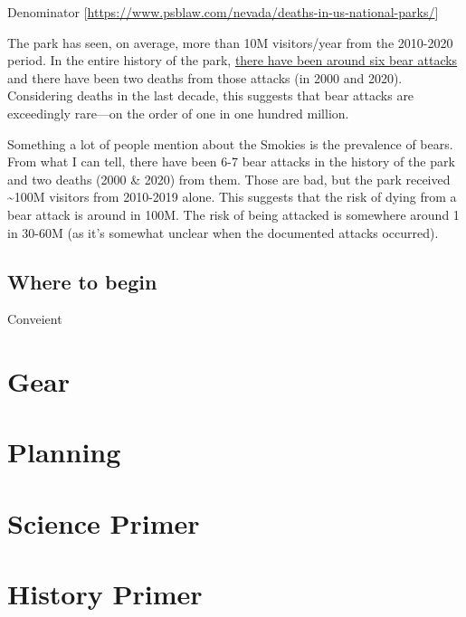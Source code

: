 \documentclass[
]{book}
\begin{document}
Denominator {[}\url{https://www.psblaw.com/nevada/deaths-in-us-national-parks/}{]}

The park has seen, on average, more than 10M visitors/year from the 2010-2020 period. In the entire history of the park, \href{https://www.knoxnews.com/story/news/local/2020/09/14/great-smokies-rangers-identify-man-found-dead-park-black-bear-scavenging-his-remains/5793471002/}{there have been around six bear attacks} and there have been two deaths from those attacks (in 2000 and 2020). Considering deaths in the last decade, this suggests that bear attacks are exceedingly rare---on the order of one in one hundred million.

Something a lot of people mention about the Smokies is the prevalence of bears. From what I can tell, there have been 6-7 bear attacks in the history of the park and two deaths (2000 \& 2020) from them. Those are bad, but the park received \textasciitilde100M visitors from 2010-2019 alone. This suggests that the risk of dying from a bear attack is around in 100M. The risk of being attacked is somewhere around 1 in 30-60M (as it's somewhat unclear when the documented attacks occurred).

\hypertarget{where-to-begin}{%
\section{Where to begin}\label{where-to-begin}}

Conveient

\hypertarget{gear-1}{%
\chapter{Gear}\label{gear-1}}

\hypertarget{planning}{%
\chapter{Planning}\label{planning}}

\hypertarget{science-primer}{%
\chapter{Science Primer}\label{science-primer}}

\hypertarget{history-primer}{%
\chapter{History Primer}\label{history-primer}}
\end{document}
